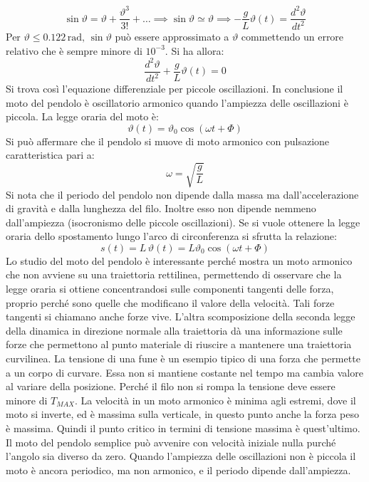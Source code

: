 \documentclass[10pt,a4paper]{book}
\begin{document}
\[
	\sin\vartheta=\vartheta+\frac{\vartheta^3}{3!}+\dots \implies \sin\vartheta \simeq \vartheta \implies -\frac{g}{L}\vartheta(t)=\frac{d^2\vartheta}{dt^2}
\]
Per $\vartheta \le 0.122 \,\text{rad}, \,\sin\vartheta$ può essere approssimato a $\vartheta$ commettendo un errore relativo che è sempre minore di $10^{-3}$. Si ha allora:
\begin{equation}
	\frac{d^2\vartheta}{dt^2}+\frac{g}{L}\vartheta(t)=0
\end{equation}
Si trova così l'equazione differenziale per piccole oscillazioni. In conclusione il moto del pendolo è oscillatorio armonico quando l'ampiezza delle oscillazioni è piccola. La legge oraria del moto è:
\[
	\vartheta(t)=\vartheta_0\cos(\omega t+\Phi)
\]
Si può affermare che il pendolo si muove di moto armonico con pulsazione caratteristica pari a:
\[
	\omega=\sqrt{\frac{g}{L}}
\]
Si nota che il periodo del pendolo non dipende dalla massa ma dall'accelerazione di gravità e dalla lunghezza del filo. Inoltre esso non dipende nemmeno dall'ampiezza (isocronismo delle piccole oscillazioni).
Se si vuole ottenere la legge oraria dello spostamento lungo l'arco di circonferenza si sfrutta la relazione:
\[
	s(t)=L\,\vartheta(t)=L\vartheta_0\cos(\omega t+\Phi)
\]
Lo studio del moto del pendolo è interessante perché mostra un moto armonico che non avviene su una traiettoria rettilinea, permettendo di osservare che la legge oraria si ottiene concentrandosi sulle componenti tangenti delle forza, proprio perché sono quelle che modificano il valore della velocità. Tali forze tangenti si chiamano anche forze vive. L'altra scomposizione della seconda legge della dinamica in direzione normale alla traiettoria dà una informazione sulle forze che permettono al punto materiale di riuscire a mantenere una traiettoria curvilinea. La tensione di una fune è un esempio tipico di una forza che permette a un corpo di curvare. Essa non si mantiene costante nel tempo ma cambia valore al variare della posizione. Perché il filo non si rompa la tensione deve essere minore di $T_{MAX}$. La velocità in un moto armonico è minima agli estremi, dove il moto si inverte, ed è massima sulla verticale, in questo punto anche la forza peso è massima. Quindi il punto critico in termini di tensione massima è quest'ultimo.
Il moto del pendolo semplice può avvenire con velocità iniziale nulla purché l'angolo sia diverso da zero. Quando l'ampiezza delle oscillazioni non è piccola il moto è ancora periodico, ma non armonico, e il periodo dipende dall'ampiezza.
\end{document}
